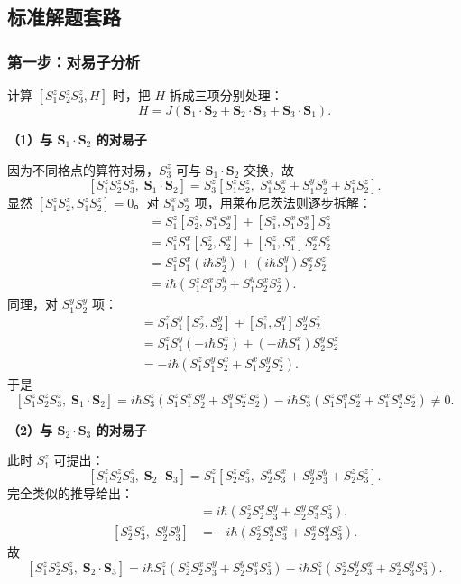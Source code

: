 \subsection{标准解题套路}

\subsubsection{第一步：对易子分析}

计算 $[S_1^z S_2^z S_3^z, H]$ 时，把 $H$ 拆成三项分别处理：
\[
H = J(\bm{S}_1\cdot\bm{S}_2 + \bm{S}_2\cdot\bm{S}_3 + \bm{S}_3\cdot\bm{S}_1).
\]

\textbf{（1）与 $\bm{S}_1\cdot\bm{S}_2$ 的对易子}

因为不同格点的算符对易，$S_3^z$ 可与 $\bm{S}_1\cdot\bm{S}_2$ 交换，故
\[
[S_1^z S_2^z S_3^z,\; \bm{S}_1\cdot\bm{S}_2] = S_3^z [S_1^z S_2^z,\; S_1^x S_2^x + S_1^y S_2^y + S_1^z S_2^z].
\]
显然 $[S_1^z S_2^z, S_1^z S_2^z]=0$。对 $S_1^x S_2^x$ 项，用莱布尼茨法则逐步拆解：
\begin{align*}
[S_1^z S_2^z,\; S_1^x S_2^x]
&= S_1^z [S_2^z, S_1^x S_2^x] + [S_1^z, S_1^x S_2^x] S_2^z \\
&= S_1^z S_1^x [S_2^z, S_2^x] + [S_1^z, S_1^x] S_2^x S_2^z \\
&= S_1^z S_1^x (i\hbar S_2^y) + (i\hbar S_1^y) S_2^x S_2^z \\
&= i\hbar (S_1^z S_1^x S_2^y + S_1^y S_2^x S_2^z).
\end{align*}
同理，对 $S_1^y S_2^y$ 项：
\begin{align*}
[S_1^z S_2^z,\; S_1^y S_2^y]
&= S_1^z S_1^y [S_2^z, S_2^y] + [S_1^z, S_1^y] S_2^y S_2^z \\
&= S_1^z S_1^y (-i\hbar S_2^x) + (-i\hbar S_1^x) S_2^y S_2^z \\
&= -i\hbar (S_1^z S_1^y S_2^x + S_1^x S_2^y S_2^z).
\end{align*}
于是
\[
[S_1^z S_2^z S_3^z,\; \bm{S}_1\cdot\bm{S}_2] = i\hbar S_3^z (S_1^z S_1^x S_2^y + S_1^y S_2^x S_2^z) - i\hbar S_3^z (S_1^z S_1^y S_2^x + S_1^x S_2^y S_2^z) \neq 0.
\]

\textbf{（2）与 $\bm{S}_2\cdot\bm{S}_3$ 的对易子}

此时 $S_1^z$ 可提出：
\[
[S_1^z S_2^z S_3^z,\; \bm{S}_2\cdot\bm{S}_3] = S_1^z [S_2^z S_3^z,\; S_2^x S_3^x + S_2^y S_3^y + S_2^z S_3^z].
\]
完全类似的推导给出：
\begin{align*}
[S_2^z S_3^z,\; S_2^x S_3^x] &= i\hbar (S_2^z S_2^x S_3^y + S_2^y S_3^x S_3^z), \\
[S_2^z S_3^z,\; S_2^y S_3^y] &= -i\hbar (S_2^z S_2^y S_3^x + S_2^x S_3^y S_3^z).
\end{align*}
故
\[
[S_1^z S_2^z S_3^z,\; \bm{S}_2\cdot\bm{S}_3] = i\hbar S_1^z (S_2^z S_2^x S_3^y + S_2^y S_3^x S_3^z) - i\hbar S_1^z (S_2^z S_2^y S_3^x + S_2^x S_3^y S_3^z).
\]

